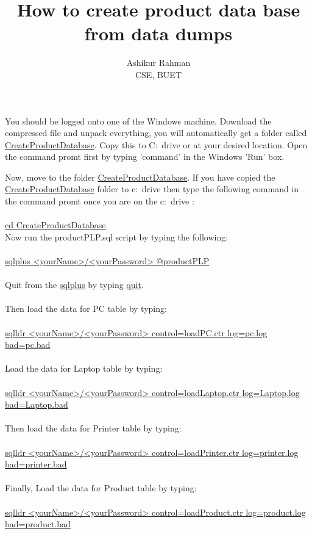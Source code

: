 \documentclass[11pt]{article}
\begin{document}
\title{How to create product data base from data dumps}
\author{Ashikur Rahman\\
CSE, BUET}
\maketitle



You should be logged onto one of the Windows machine. Download the compressed file and unpack everything, you will automatically
get a folder called \url{CreateProductDatabase}. Copy this to C:\ drive or at your desired location.
Open the command promt first by typing 'command' in the Windows 'Run' box.

 Now, move to the folder \url{CreateProductDatabase}. If you have 
copied the \url{CreateProductDatabase} folder to c:\ drive then type
the following command in the command promt once you are on the c:\ drive :
\\
\\
\noindent   \url{cd CreateProductDatabase}
\\

Now run the productPLP.sql script by typing the following:
\\
\\
\noindent   \url{sqlplus <yourName>/<yourPassword> @productPLP}
\\
\\
Quit from the \url{sqlplus} by typing \url{quit}.
\\
\\
Then load the data for PC table by typing:
\\
\\
\noindent   \url{sqlldr <yourName>/<yourPassword> control=loadPC.ctr log=pc.log bad=pc.bad}
\\
\\
Load the data for Laptop table by typing:
\\
\\
\noindent   \url{sqlldr <yourName>/<yourPassword> control=loadLaptop.ctr log=Laptop.log bad=Laptop.bad}
\\
\\
Then load the data for Printer table by typing:
\\
\\
\noindent   \url{sqlldr <yourName>/<yourPassword> control=loadPrinter.ctr log=printer.log bad=printer.bad}
\\
\\
Finally, Load the data for Product table by typing:
\\
\\
\noindent   \url{sqlldr <yourName>/<yourPassword> control=loadProduct.ctr log=product.log bad=product.bad}
\\
\\
\end{document}
